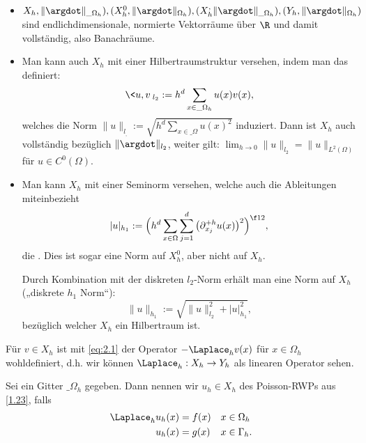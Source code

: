 \begin{nt*}[Nebenbemerkungen]
	\begin{itemize}
		\item
			$X_h, \|\argdot\|_{\_\Omega_h}), (X_h^0, \|\argdot\|_{\Omega_h}), (X_h^ , \|\argdot\|_{\_\Omega_h}), (Y_h, \|\argdot\|_{\Omega_h})$ sind endlichdimensionale, normierte Vektorräume über $\R$ und damit vollständig, also Banachräume.
		\item
			Man kann auch $X_h$ mit einer Hilbertraumstruktur versehen, indem man das  definiert:
			\[
				\<u,v\>_{l_2} := h^d \sum_{x\in\_\Omega_h} u(x) v(x),
			\]
			welches die Norm $\|u\|_{l_,} := \sqrt{h^d \sum_{x\in\_\Omega} u(x)^2}$ induziert.
			Dann ist $X_h$ auch vollständig bezüglich $\|\argdot\|_{l_2}$, weiter gilt: $\lim_{h\to 0} \|u\|_{l_2} = \|u\|_{L^2(\Omega)}$ für $u \in C^0(\Omega)$.
		\item
			Man kann $X_h$ mit einer Seminorm versehen, welche auch die Ableitungen miteinbezieht
			\[
				|u|_{h_1}
				:= \Big( h^d \sum_{x\in\Omega} \sum_{j=1}^d  \big(\partial_{x_j}^{+h} u(x)\big)^2 \Big)^{\f 12},
			\]
			die .
			Dies ist sogar eine Norm auf $X_h^0$, aber nicht auf $X_h$.

			Durch Kombination mit der diskreten $l_2$-Norm erhält man eine Norm auf $X_h$ („diskrete $h_1$ Norm“):
			\[
				\|u\|_{h_1}
				:= \sqrt{\|u\|_{l_2}^2 + |u|_{h_1}^2},
			\]
			bezüglich welcher $X_h$ ein Hilbertraum ist.
	\end{itemize}
\end{nt*}

Für $v \in X_h$ ist mit \eqref{eq:2.1} der Operator $-\Laplace_h v(x)$ für $x \in \Omega_h$ wohldefiniert, d.h. wir können $\Laplace_h : X_h \to Y_h$ als linearen Operator sehen.

\begin{df} \label{2.7}
	Sei ein Gitter $\_\Omega_h$ gegeben.
	Dann nennen wir $u_h \in X_h$  des Poisson-RWPs aus \ref{1.23}, falls
	\begin{align} \label{eq:2.2}
		\Laplace_h u_h(x) &= f(x) && \text{$x \in \Omega_h$} \\
		u_h(x) &= g(x) && \text{$x\in \Gamma_h$}. \notag
	\end{align}
\end{df}

